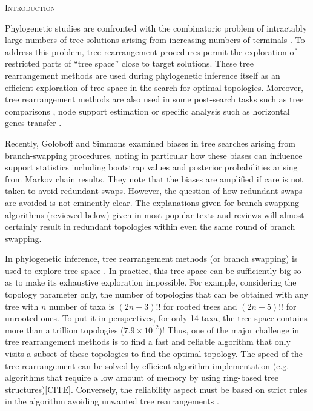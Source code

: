 \documentclass[12pt,letterpaper]{article}
\renewcommand{\section}[1]{%
\bigskip
\begin{center}
\begin{Large}
\normalfont\scshape #1
\medskip
\end{Large}
\end{center}}
\begin{document}
\section{Introduction}

Phylogenetic studies are confronted with the combinatoric problem of intractably large numbers of tree solutions arising from increasing numbers of terminals \citep[]{Felsenstein:1978vh}.
To address this problem, tree rearrangement procedures permit the exploration of restricted parts of ``tree space'' close to target solutions.
These tree rearrangement methods are used during phylogenetic inference itself as an efficient exploration of tree space \citep[see ][]{Sanderson448} in the search for optimal topologies. 
Moreover, tree rearrangement methods are also used in some post-search tasks such as tree comparisons \citep[e.g.][]{allen2001subtree,kuhner2015treComparison}, node support estimation \citep[e.g.][]{goloboff2014bias} or specific analysis such as horizontal genes transfer \citep[e.g.][]{mcfadden1995something,bordewich2005computational}.

Recently, Goloboff and Simmons \citep[(2014)]{goloboff2014bias} examined biases in tree searches arising from branch-swapping procedures, noting in particular how these biases can influence support statistics including bootstrap values and posterior probabilities arising from Markov chain results.
They note that the biases are amplified if care is not taken to avoid redundant swaps.
However, the question of how redundant swaps are avoided is not eminently clear.
The explanations given for branch-swapping algorithms (reviewed below) given in most popular texts and reviews will almost certainly result in redundant topologies within even the same round of branch swapping.



In phylogenetic inference, tree rearrangement methods (or branch swapping) is used to explore tree space \citep[i.e. the realm of all the possible trees;][]{page1993islands,morrison2007increasing,Sanderson448}.
In practice, this tree space can be sufficiently big so as to make its exhaustive exploration impossible.
For example, considering the topology parameter only, the number of topologies that can be obtained with any tree with $n$ number of taxa is $(2n-3)!!$ for rooted trees and $(2n-5)!!$ for unrooted ones.
To put it in perspectives, for only 14 taxa, the tree space contains more than a trillion topologies ($7.9\times10^{12}$)!
Thus, one of the major challenge in tree rearrangement methods is to find a fast and reliable algorithm that only visits a subset of these topologies to find the optimal topology. 
The speed of the tree rearrangement can be solved by efficient algorithm implementation (e.g. algorithms that require a low amount of memory by using ring-based tree structures)[CITE].
Conversely, the reliability aspect must be based on strict rules in the algorithm avoiding unwanted tree rearrangements \citep{allen2001subtree,felsenstein2004inferring,lakner2008efficiency,goloboff1993character}.
\end{document}
